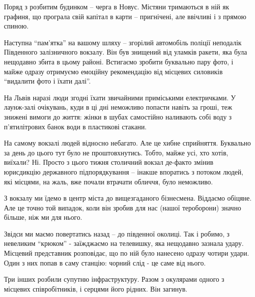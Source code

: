 

Поряд з розбитим будинком – черга в Новус. Містяни тримаються в ній як графиня,
що програла свій капітал в карти – пригнічені, але ввічливі і з прямою спиною.

Наступна \enquote{пам'ятка} на вашому шляху – згорілий автомобіль поліції неподалік
Південного залізничного вокзалу. Він був знищений від уламків ракети, яка була
нещодавно збита в цьому районі. Встигаємо зробити буквально пару фото, і майже
одразу отримуємо емоційну рекомендацію від місцевих силовиків \enquote{видалити фото і
їхати далі}.


На Львів наразі люди згодні їхати звичайними приміськими електричками. У
лаунж-залі очікувань, куди в ці дні неможливо попасти навіть за гроші, теж
знижені вимоги до життя: жінки в шубах самостійно наливають собі воду з
п’ятилітрових банок води в пластикові стакани.

На самому вокзалі людей відносно небагато. Але це хибне сприйняття. Буквально
за день до цього тут було не проштовхнутись. Тобто, майже усі, хто хотів,
виїхали? Ні. Просто з цього тижня столичний вокзал де-факто змінив юрисдикцію
державного підпорядкування – інакше впоратись з потоком людей, які місцями, на
жаль, вже почали втрачати обличчя, було неможливо.


З вокзалу ми їдемо в центр міста до вищезгаданого бізнесмена. Віддаємо обіцяне.
Але це точно той випадок, коли він зробив для нас (нашої тероборони) значно
більше, ніж ми для нього. 


Звідси ми маємо повертатись назад – до південної околиці. Так і робимо, з
невеликим \enquote{крюком} - заїжджаємо на телевишку, яка нещодавно зазнала удару.
Місцевий представник розповідає, що по ній було нанесено одразу чотири удари.
Один з них попав в саму станцію: чорний слід  - це саме від нього. 

Три інших розбили супутню інфраструктуру. Разом з окулярами одного з місцевих
співробітників, і серцями його рідних. Він загинув.

